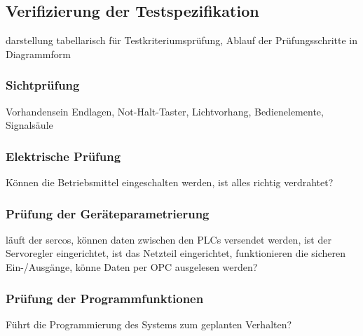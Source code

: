 \documentclass[../../../Bachelorarbeit.tex]{subfiles}
\begin{document}
\subsection{Verifizierung der Testspezifikation}
darstellung tabellarisch für Testkriteriumsprüfung, Ablauf der Prüfungsschritte in Diagrammform

\subsubsection{Sichtprüfung}
Vorhandensein Endlagen, Not-Halt-Taster, Lichtvorhang, Bedienelemente, Signalsäule

\subsubsection{Elektrische Prüfung}
Können die Betriebsmittel eingeschalten werden, ist alles richtig verdrahtet?

\subsubsection{Prüfung der Geräteparametrierung}
läuft der sercos, können daten zwischen den PLCs versendet werden, ist der Servoregler eingerichtet, ist das Netzteil eingerichtet, funktionieren die sicheren Ein-/Ausgänge, könne Daten per OPC ausgelesen werden?

\subsubsection{Prüfung der Programmfunktionen}
Führt die Programmierung des Systems zum geplanten Verhalten? 
\end{document}
